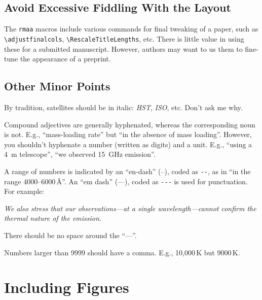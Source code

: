 \documentclass[debug]{rmxaa}
\newcommand{\CS}[1]{\texttt{\textbackslash #1}}
\newenvironment{Example}
{\begin{list}{}{\setlength{\leftmargin}{10pt}\setlength{\rightmargin}{10pt}}%
  \item[]\itshape}
  {\end{list}}
\begin{document}
\subsection{Avoid Excessive Fiddling With the Layout }
\label{sec:fiddling}

The \texttt{rmaa} macros include various commands for final tweaking
of a paper, such as \CS{adjustfinalcols}, \CS{RescaleTitleLengths},
etc.  There is little value in using these for a submitted manuscript.
However, authors may want to us them to fine-tune the appearance of a
preprint.  

\subsection{Other Minor Points}
\label{sec:little}

By tradition, satellites should be in italic: \textit{HST},
\textit{ISO}, etc. Don't ask me why. 

Compound adjectives are generally hyphenated, whereas the
corresponding noun is not. E.g., ``mass-loading rate'' but ``in the
absence of mass loading''. However, you shouldn't hyphenate a number
(written as digits) and a unit. E.g., ``using a 4~m telescope'', ``we
observed 15~GHz emission''. 

A range of numbers is indicated by an ``en-dash'' (--), coded as
\verb+--+, as in ``in the range 4000--6000\,\AA''. An ``em dash''
(---), coded as \verb+---+ is used for punctuation. For example: 
\begin{Example}
  We also stress that our observations---at a single
  wavelength---cannot confirm the thermal nature of the emission.
\end{Example}
There should be  no space around the ``---''. 

Numbers larger than 9999 should have a comma. E.g., 10,000\,K but
9000\,K\@.

\section{Including Figures}
\label{sec:EPS}
\end{document}
